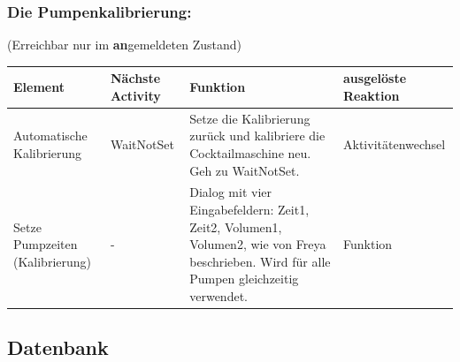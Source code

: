 \subsubsection{Die Pumpenkalibrierung:}
(Erreichbar nur im \textbf{an}gemeldeten Zustand)
\begin{table}
	\centering
	\begin{tabular}{|l|l|l|l|}
		\hline
		\textbf{Element } & \textbf{Nächste Activity } & \textbf{Funktion } & \textbf{ausgelöste Reaktion} \\ \hline
		Automatische Kalibrierung  & WaitNotSet  & Setze die Kalibrierung zurück und kalibriere die Cocktailmaschine neu. Geh zu WaitNotSet.  & Aktivitätenwechsel \\ \hline
		Setze Pumpzeiten (Kalibrierung)  & -  & Dialog mit vier Eingabefeldern: Zeit1, Zeit2, Volumen1, Volumen2, wie von Freya beschrieben. Wird für alle Pumpen gleichzeitig verwendet.  & Funktion \\ \hline
	\end{tabular}
\end{table}




\subsection{Datenbank}

